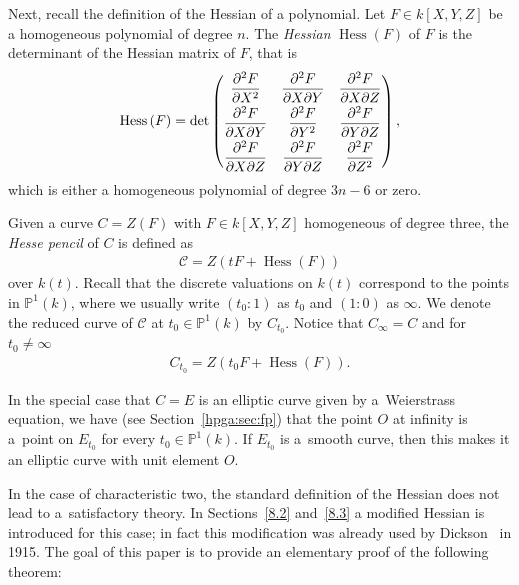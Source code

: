 \documentclass[pdftex]{sigma}
\newcommand{\mpp}{{\mathbb{P}}}
\newcommand{\msetp}[1]{{\left({#1}\right)}}					%
\newcommand{\msets}[1]{{\left[{#1}\right]}}					%
\newcommand{\mhess}[1]{\operatorname{Hess}\msetp{#1}}			%
\newcommand{\mps}[2]{{\mpp^{#1}\msetp{#2}}}						%
\numberwithin{equation}{section}
\begin{document}
Next, recall the definition of the Hessian of a polynomial. Let $F\in k\msets {X,Y,Z}$ be a homogeneous polynomial of degree $n$. The \emph{Hessian} $\mhess{F}$ of $F$ is the determinant of the Hessian matrix of $F$, that is
\begin{gather*}
\mhess{F}=\det
\begin{pmatrix}
\dfrac{\partial^2 F}{\partial X^2} & \dfrac{\partial^2 F}{\partial X \partial Y} & \dfrac{\partial^2 F}{\partial X \partial Z} \vspace{1mm}\\
\dfrac{\partial^2 F}{\partial X \partial Y} & \dfrac{\partial^2 F}{\partial Y^2} & \dfrac{\partial^2 F}{\partial Y \partial Z} \vspace{1mm}\\
\dfrac{\partial^2 F}{\partial X \partial Z} & \dfrac{\partial^2 F}{\partial Y \partial Z} & \dfrac{\partial^2 F}{\partial Z^2}
\end{pmatrix},
\end{gather*}
which is either a homogeneous polynomial of degree $3n-6$ or zero.

Given a curve $C=Z\msetp{F}$ with $F\in k\msets{X,Y,Z}$ homogeneous of degree three, the \emph{Hesse pencil} of $C$ is defined as
\begin{gather*}
\mathcal{C}=Z\msetp{tF+\mhess{F}}
\end{gather*}
over $k\msetp{t}$. Recall that the discrete valuations on $k\msetp{t}$ correspond to the points in $\mps{1}{k}$, where we usually write $\msetp{t_0:1}$ as $t_0$ and $\msetp{1:0}$ as $\infty$. We denote the reduced curve of $\mathcal {C}$ at $t_0\in\mps{1}{k}$ by $C_{t_0}$. Notice that $C_\infty=C$ and for $t_0 \neq\infty$
\begin{gather*}
C_{t_0}=Z\msetp{t_0F+\mhess{F}}.
\end{gather*}

In the special case that $C=E$ is an elliptic curve given by a~Weierstrass equation, we have (see Section~\ref{hpga:sec:fp}) that the point $O$ at infinity is a~point on $E_{t_0}$ for every $t_0\in\mps{1}{k}$. If $E_{t_0}$ is a~smooth curve, then this makes it an elliptic curve with unit element $O$.

In the case of characteristic two, the standard definition of the Hessian does not lead to a~satisfactory theory. In Sections~\ref{8.2} and~\ref{8.3} a modified Hessian is introduced for this case; in fact this modification was already used by Dickson~\cite{Dickson} in 1915. The goal of this paper is to provide an elementary proof of the following theorem:
\end{document}
